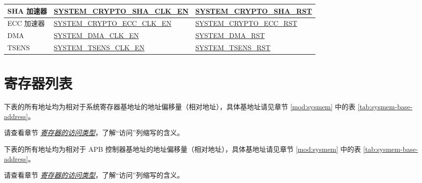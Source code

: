 \documentclass[main\_\_CN.tex]{subfiles}
\begin{document}
\begin{ThreePartTable}
\begin{longtable}[c]{ |l|l|l| }
    SHA 加速器 & \hyperref[fielddesc:SYSTEMCRYPTOSHACLKEN]{SYSTEM\_CRYPTO\_SHA\_CLK\_EN} & \hyperref[fielddesc:SYSTEMCRYPTOSHARST]{SYSTEM\_CRYPTO\_SHA\_RST} \\\hline
    ECC 加速器 & \hyperref[fielddesc:SYSTEMCRYPTOECCCLKEN]{SYSTEM\_CRYPTO\_ECC\_CLK\_EN} & \hyperref[fielddesc:SYSTEMCRYPTOECCRST]{SYSTEM\_CRYPTO\_ECC\_RST} \\\hline
    DMA & \hyperref[fielddesc:SYSTEMDMACLKEN]{SYSTEM\_DMA\_CLK\_EN} & \hyperref[fielddesc:SYSTEMDMARST]{SYSTEM\_DMA\_RST}\tnote{5}  \\\hline
    TSENS & \hyperref[fielddesc:SYSTEMTSENSCLKEN]{SYSTEM\_TSENS\_CLK\_EN} & \hyperref[fielddesc:SYSTEMTSENSRST]{SYSTEM\_TSENS\_RST} \\\hline
\end{longtable}
\end{ThreePartTable}




\clearpage
\section{寄存器列表}
\label{sec:sysreg-reg-summ}
\hypertarget{sysreg-reg-summ}{}

下表的所有地址均为相对于系统寄存器基地址的地址偏移量（相对地址），具体基地址请见章节 \ref{mod:sysmem} \textit{} 中的表 \ref{tab:sysmem-base-address}。

请查看章节 \hyperref[glossary-access-types]{\textit{寄存器的访问类型}}，了解“访问”列缩写的含义。



下表的所有地址均为相对于 APB 控制器基地址的地址偏移量（相对地址），具体基地址请见章节 \ref{mod:sysmem} \textit{} 中的表 \ref{tab:sysmem-base-address}。

请查看章节 \hyperref[glossary-access-types]{\textit{寄存器的访问类型}}，了解“访问”列缩写的含义。



\end{document}
